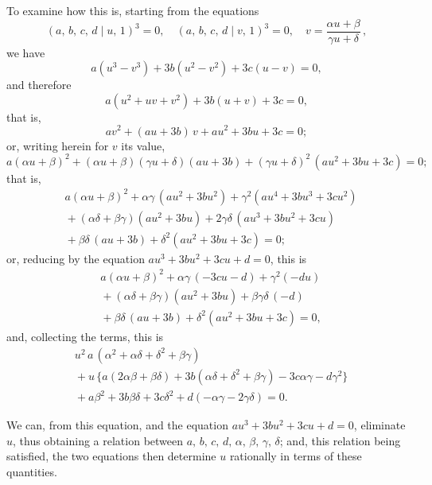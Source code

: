 \documentclass[11pt]{article}
\begin{document}
\medskip
To examine how this is, starting from the equations
\[
  (a,\,b,\,c,\,d \mid u,\,1)^{3} = 0,\quad
  (a,\,b,\,c,\,d \mid v,\,1)^{3} = 0,\quad
  v = \frac{\alpha u + \beta}{\gamma u + \delta}\,,
\]
we have
\[
  a(u^{3} - v^{3}) + 3 b(u^{2} - v^{2}) + 3 c(u - v) = 0,
\]
and therefore
\[
  a(u^{2} + u v + v^{2}) + 3 b(u + v) + 3 c = 0,
\]
that is,
\[
  a v^{2} + (a u + 3 b)\,v + a u^{2} + 3 b u + 3 c = 0;
\]
or, writing herein for $v$ its value,
\[
  a(\alpha u + \beta)^{2} + (\alpha u + \beta)(\gamma u + \delta)(a u + 3 b) + (\gamma u + \delta)^{2}\,(a u^{2} + 3 b u + 3 c) = 0;
\]
that is,
\begin{align*}
  & a(\alpha u + \beta)^{2}
    + \alpha \gamma\,(a u^{2} + 3 b u^{2})
    + \gamma^{2}(a u^{4} + 3 b u^{3} + 3 c u^{2})\\
  & {} + (\alpha \delta + \beta \gamma)(a u^{2} + 3 b u)
    + 2 \gamma \delta\,(a u^{3} + 3 b u^{2} + 3 c u)\\
  & {} + \beta \delta\,(a u + 3 b)
    + \delta^{2}(a u^{2} + 3 b u + 3 c) = 0;
\end{align*}
or, reducing by the equation $a u^{3} + 3 b u^{2} + 3 c u + d = 0$, this is
\begin{align*}
  & a(\alpha u + \beta)^{2}
    + \alpha \gamma\,(-3 c u - d)
    + \gamma^{2}(-d u)\\
  & {} + (\alpha \delta + \beta \gamma)(a u^{2} + 3 b u)
    + \beta \gamma \delta\,(-d)\\
  & {} + \beta \delta\,(a u + 3 b)
    + \delta^{2}(a u^{2} + 3 b u + 3 c) = 0,
\end{align*}
and, collecting the terms, this is
\begin{align*}
  & u^{2}\,a\,(\alpha^{2} + \alpha \delta + \delta^{2} + \beta \gamma)\\
  & {} + u\,\{a(2 \alpha \beta + \beta \delta) + 3 b(\alpha \delta + \delta^{2} + \beta \gamma) - 3 c \alpha \gamma - d \gamma^{2}\}\\
  & {} + a \beta^{2} + 3 b \beta \delta + 3 c \delta^{2} + d(- \alpha \gamma - 2 \gamma \delta) = 0.
\end{align*}

\medskip
We can, from this equation, and the equation $a u^{3} + 3 b u^{2} + 3 c u + d = 0$, eliminate $u$, thus
obtaining a relation between $a,\,b,\,c,\,d,\,\alpha,\,\beta,\,\gamma,\,\delta$; and, this relation being satisfied, the
two equations then determine $u$ rationally in terms of these quantities.
\end{document}
